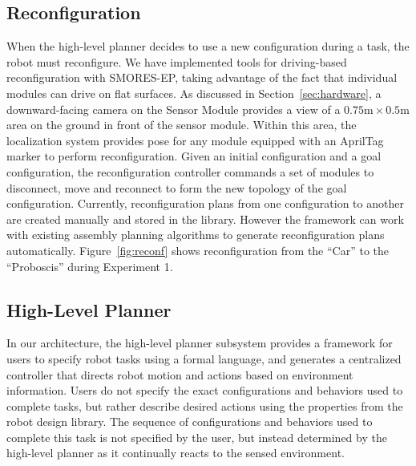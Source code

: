 \documentclass[12pt]{article}
\begin{document}

\subsection{Reconfiguration}
\label{sec:reconfiguration}
%
When the high-level planner decides to use a new configuration during a task, the robot must reconfigure.
We have implemented tools for driving-based reconfiguration with SMORES-EP, taking advantage of the fact that individual modules can drive on flat surfaces.
As discussed in Section~\ref{sec:hardware}, a downward-facing camera on the Sensor Module provides a view of a $0.75\text{m}\times0.5\text{m}$ area on the ground in front of the sensor module.
Within this area, the localization system provides pose for any module equipped with an AprilTag marker to perform reconfiguration. 
Given an initial configuration and a goal configuration, the reconfiguration controller commands a set of modules to disconnect, move and reconnect to form the new topology of the goal configuration. 
Currently, reconfiguration plans from one configuration to another are created manually and stored in the library. However the framework can work with existing assembly planning algorithms \cite{Werfel2007,Seo2013} to generate reconfiguration plans automatically.
Figure~\ref{fig:reconf} shows reconfiguration from the ``Car'' to the ``Proboscis'' during Experiment 1.
%

\subsection{High-Level Planner}
\label{sec:high-level}

In our architecture, the high-level planner subsystem provides a framework for users to specify robot tasks using a formal language, and generates a centralized controller that directs robot motion and actions based on environment information.
Users do not specify the exact configurations and behaviors used to complete tasks, but rather describe desired actions using the properties from the robot design library.
The sequence of configurations and behaviors used to complete this task is not specified by the user, but instead determined by the high-level planner as it continually reacts to the sensed environment.
\end{document}
